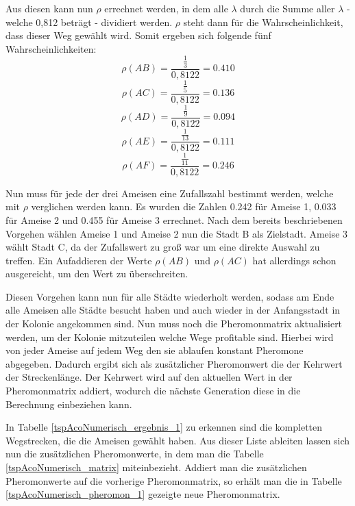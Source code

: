 	Aus diesen kann nun $\rho$ errechnet werden, in dem alle $\lambda$ durch die Summe aller $\lambda$ - welche 0,812 beträgt - dividiert werden. $\rho$ steht dann für die Wahrscheinlichkeit, dass dieser Weg gewählt wird. Somit ergeben sich folgende fünf Wahrscheinlichkeiten:
	\begin{equation}
		\rho(AB) = \frac{\frac{1}{3}}{0,8122} = 0.410
	\end{equation}
	\begin{equation}
		\rho(AC) = \frac{\frac{1}{5}}{0,8122} = 0.136
	\end{equation}
	\begin{equation}
		\rho(AD) = \frac{\frac{1}{9}}{0,8122} = 0.094
	\end{equation}
	\begin{equation}
		\rho(AE) = \frac{\frac{1}{13}}{0,8122} = 0.111
	\end{equation}
	\begin{equation}
		\rho(AF) = \frac{\frac{1}{11}}{0,8122} = 0.246
	\end{equation}
	
	Nun muss für jede der drei Ameisen eine Zufallszahl bestimmt werden, welche mit $\rho$ verglichen werden kann. Es wurden die Zahlen 0.242 für Ameise 1, 0.033 für Ameise 2 und 0.455 für Ameise 3 errechnet.
	Nach dem bereits beschriebenen Vorgehen wählen Ameise 1 und Ameise 2 nun die Stadt B als Zielstadt. Ameise 3 wählt Stadt C, da der Zufallswert zu groß war um eine direkte Auswahl zu treffen. Ein Aufaddieren der Werte $\rho(AB)$ und $\rho(AC)$ hat allerdings schon ausgereicht, um den Wert zu überschreiten.
	
	Diesen Vorgehen kann nun für alle Städte wiederholt werden, sodass am Ende alle Ameisen alle Städte besucht haben und auch wieder in der Anfangsstadt in der Kolonie angekommen sind. Nun muss noch die Pheromonmatrix aktualisiert werden, um der Kolonie mitzuteilen welche Wege profitable sind. Hierbei wird von jeder Ameise auf jedem Weg den sie ablaufen konstant Pheromone abgegeben. Dadurch ergibt sich als zusätzlicher Pheromonwert die der Kehrwert der Streckenlänge. Der Kehrwert wird auf den aktuellen Wert in der Pheromonmatrix addiert, wodurch die nächste Generation diese in die Berechnung einbeziehen kann.
	
	In Tabelle \ref{tspAcoNumerisch_ergebnis_1} zu erkennen sind die kompletten Wegstrecken, die die Ameisen gewählt haben. Aus dieser Liste ableiten lassen sich nun die zusätzlichen Pheromonwerte, in dem man die Tabelle \ref{tspAcoNumerisch_matrix} miteinbezieht. Addiert man die zusätzlichen Pheromonwerte auf die vorherige Pheromonmatrix, so erhält man die in Tabelle \ref{tspAcoNumerisch_pheromon_1} gezeigte neue  Pheromonmatrix.
	
